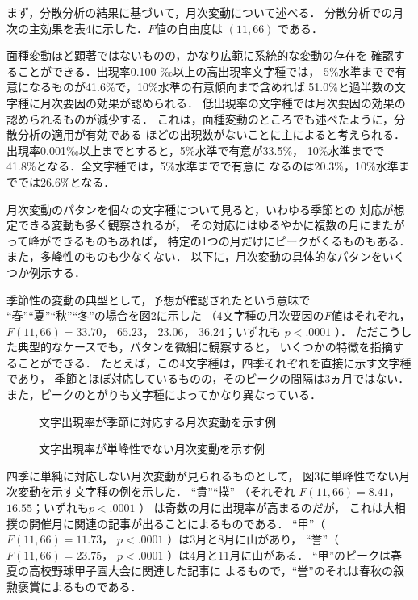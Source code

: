   まず，分散分析の結果に基づいて，月次変動について述べる．
分散分析での月次の主効果を表4に示した．$F$値の自由度は $(11,66)$ である．



  面種変動ほど顕著ではないものの，かなり広範に系統的な変動の存在を
確認することができる．出現率0.100 ‰以上の高出現率文字種では，
5\%水準までで有意になるものが41.6\%で，10\%水準の有意傾向まで含めれば
51.0\%と過半数の文字種に月次要因の効果が認められる．
低出現率の文字種では月次要因の効果の認められるものが減少する．
これは，面種変動のところでも述べたように，分散分析の適用が有効である
ほどの出現数がないことに主によると考えられる．
出現率0.001‰以上までとすると，5\%水準で有意が33.5\%，
10\%水準までで41.8\%となる．全文字種では，5\%水準までで有意に
なるのは20.3\%，10\%水準まででは26.6\%となる．

  月次変動のパタンを個々の文字種について見ると，いわゆる季節との
対応が想定できる変動も多く観察されるが，
その対応にはゆるやかに複数の月にまたがって峰ができるものもあれば，
特定の1つの月だけにピークがくるものもある．
また，多峰性のものも少なくない．
以下に，月次変動の具体的なパタンをいくつか例示する．

  季節性の変動の典型として，予想が確認されたという意味で
“春”“夏”“秋”“冬”の場合を図2に示した
（4文字種の月次要因の$F$値はそれぞれ，
$F(11,66)=33.70$， $65.23$， $23.06$， $36.24$；いずれも $p<.0001$ ）．
ただこうした典型的なケースでも，パタンを微細に観察すると，
いくつかの特徴を指摘することができる．
たとえば，この4文字種は，四季それぞれを直接に示す文字種であり，
季節とほぼ対応しているものの，そのピークの間隔は3ヵ月ではない．
また，ピークのとがりも文字種によってかなり異なっている．
\begin{figure}[bt]  
\begin{center}
\end{center}
\caption{文字出現率が季節に対応する月次変動を示す例}
\label{図2}
\end{figure}

\begin{figure}[bt]  
\begin{center}
\end{center}
\caption{文字出現率が単峰性でない月次変動を示す例}
\label{図3}
\end{figure}

  四季に単純に対応しない月次変動が見られるものとして，
図3に単峰性でない月次変動を示す文字種の例を示した．
“貴”“撲”
（それぞれ $F(11,66)=8.41$，$16.55$；いずれも$p<.0001$ ）
は奇数の月に出現率が高まるのだが，
これは大相撲の開催月に関連の記事が出ることによるものである．
“甲”（ $F(11,66)=11.73$， $p<.0001$ ）は3月と8月に山があり，
“誉”（ $F(11,66)=23.75$， $p<.0001$ ）は4月と11月に山がある．
“甲”のピークは春夏の高校野球甲子園大会に関連した記事に
よるもので，“誉”のそれは春秋の叙勲褒賞によるものである．

